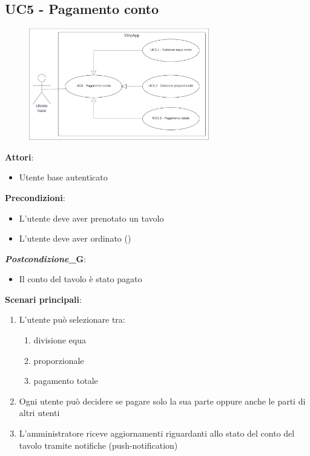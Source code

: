 \subsection{UC5 - Pagamento conto}\label{usecase:5}
\begin{figure}[H]
    \centering
    \includegraphics[width=0.7\textwidth]{ucd/UCD5.png}
\end{figure}
\textbf{Attori}:
\begin{itemize}
    \item Utente base autenticato
\end{itemize}
\textbf{Precondizioni}:
\begin{itemize}
    \item L'utente deve aver prenotato un tavolo
    \item L'utente deve aver ordinato ()
\end{itemize}
\textbf{\textit{Postcondizione}_G}:
\begin{itemize}
    \item Il conto del tavolo è stato pagato
\end{itemize}
\textbf{Scenari principali}:
\begin{enumerate}
    \item L'utente può selezionare tra:
    \begin{enumerate}
        \item divisione equa
        \item proporzionale
        \item pagamento totale
    \end{enumerate}
    \item Ogni utente può decidere se pagare solo la sua parte oppure anche le parti di altri utenti
    \item L'amministratore riceve aggiornamenti riguardanti allo stato del conto del tavolo tramite notifiche (push-notification)
\end{enumerate}



\newpage
